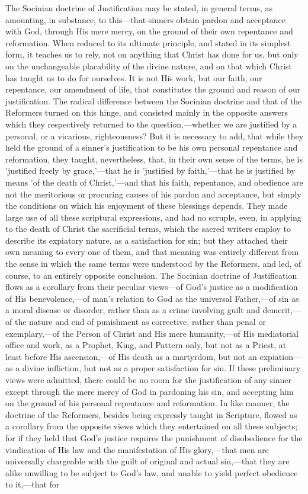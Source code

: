 \documentclass[
]{book}
\begin{document}
The Socinian doctrine of Justification may be stated, in general terms, as amounting, in substance, to this---that sinners obtain pardon and acceptance with God, through His mere mercy, on the ground of their own repentance and reformation. When reduced to its ultimate principle, and stated in its simplest form, it teaches us to rely, not on anything that Christ has done for us, but only on the unchangeable placability of the divine nature, and on that which Christ has taught us to do for ourselves. It is not His work, but our faith, our repentance, our amendment of life, that constitutes the ground and reason of our justification. The radical difference between the Socinian doctrine and that of the Reformers turned on this hinge, and consisted mainly in the opposite answers which they respectively returned to the question,---whether we are justified by a personal, or a vicarious, righteousness? But it is necessary to add, that while they held the ground of a sinner's justification to be his own personal repentance and reformation, they taught, nevertheless, that, in their own sense of the terms, he is 'justified freely by grace,'---that he is 'justified by faith,'---that he is justified by means 'of the death of Christ,'---and that his faith, repentance, and obedience are not the meritorious or procuring causes of his pardon and acceptance, but simply the conditions on which his enjoyment of these blessings depends. They made large use of all these scriptural expressions, and had no scruple, even, in applying to the death of Christ the sacrificial terms, which the sacred writers employ to describe its expiatory nature, as a satisfaction for sin; but they attached their own meaning to every one of them, and that meaning was entirely different from the sense in which the same terms were understood by the Reformers, and led, of course, to an entirely opposite conclusion. The Socinian doctrine of Justification flows as a corollary from their peculiar views---of God's justice as a modification of His benevolence,---of man's relation to God as the universal Father,---of sin as a moral disease or disorder, rather than as a crime involving guilt and demerit,---of the nature and end of punishment as corrective, rather than penal or exemplary,---of the Person of Christ and His mere humanity,---of His mediatorial office and work, as a Prophet, King, and Pattern only, but not as a Priest, at least before His ascension,---of His death as a martyrdom, but not an expiation---as a divine infliction, but not as a proper satisfaction for sin. If these preliminary views were admitted, there could be no room for the justification of any sinner except through the mere mercy of God in pardoning his sin, and accepting him on the ground of his personal repentance and reformation. In like manner, the doctrine of the Reformers, besides being expressly taught in Scripture, flowed as a corollary from the opposite views which they entertained on all these subjects; for if they held that God's justice requires the punishment of disobedience for the vindication of His law and the manifestation of His glory,---that men are universally chargeable with the guilt of original and actual sin,---that they are alike unwilling to be subject to God's law, and unable to yield perfect obedience to it,---that for 
\end{document}
